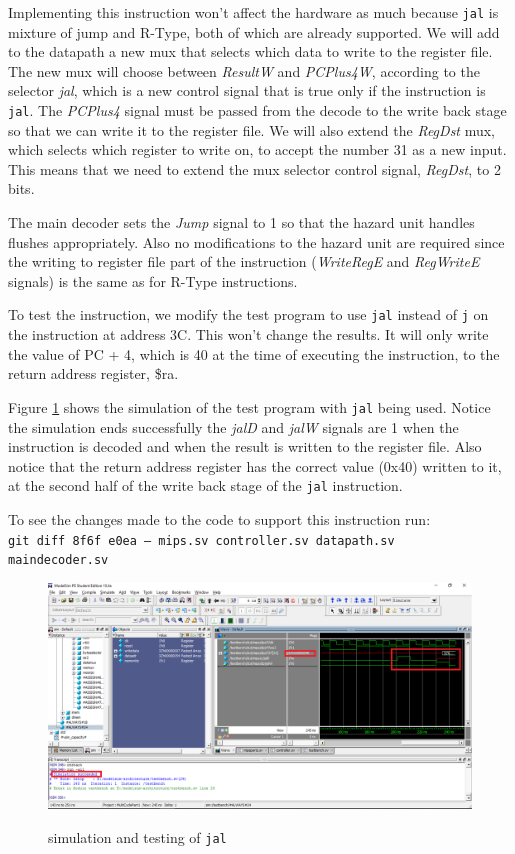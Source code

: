 \documentclass[titlepage,12pt,oneside,a4paper]{article}
\newcommand{\code}[1]{{\texttt{#1}}}
\begin{document}
Implementing this instruction won't affect the hardware as much because \code{jal} is mixture of jump and R-Type, both of which are already supported. We will add to the datapath a new mux that selects which data to write to the register file. The new mux will choose between \textit{ResultW} and \textit{PCPlus4W}, according to the selector \textit{jal}, which is a new control signal that is true only if the instruction is \code{jal}. The \textit{PCPlus4} signal must be passed from the decode to the write back stage so that we can write it to the register file. We will also extend the \textit{RegDst} mux, which selects which register to write on, to accept the number 31 as a new input. This means that we need to extend the mux selector control signal, \textit{RegDst}, to 2 bits.

The main decoder sets the \textit{Jump} signal to 1 so that the hazard unit handles flushes appropriately. Also no modifications to the hazard unit are required since the writing to register file part of the instruction (\textit{WriteRegE} and \textit{RegWriteE} signals) is the same as for R-Type instructions.

To test the instruction, we modify the test program to use \code{jal} instead of \code{j} on the instruction at address 3C. This won't change the results. It will only write the value of PC + 4, which is 40 at the time of executing the instruction, to the return address register, \$ra.

Figure \ref{jaltest} shows the simulation of the test program with \code{jal} being used. Notice the simulation ends successfully the \textit{jalD} and \textit{jalW} signals are 1 when the instruction is decoded and when the result is written to the register file. Also notice that the return address register has the correct value (0x40) written to it, at the second half of the write back stage of the \code{jal} instruction.

To see the changes made to the code to support this instruction run: \\
\code{git diff 8f6f e0ea -- mips.sv controller.sv datapath.sv \\ maindecoder.sv}

\begin{figure}
	\includegraphics[width=\textwidth]{jaltest.png}
	\centering
	\label{jaltest}
	\caption{simulation and testing of \code{jal}}
\end{figure}
\end{document}
